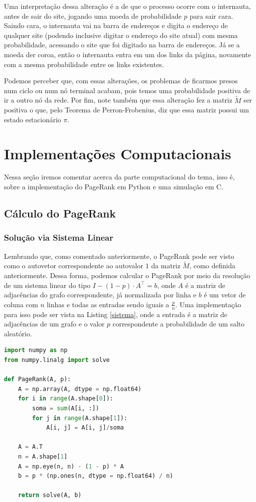 \documentclass{article}
\begin{document}
Uma interpretação dessa alteração é a de que o processo ocorre com o internauta, antes de sair do site, jogando uma moeda de probabilidade $p$ para sair cara. Saindo cara, o internauta vai na barra de endereços e digita o endereço de qualquer site (podendo inclusive digitar o endereço do site atual) com mesma probabilidade, acessando o site que foi digitado na barra de endereços. Já se a moeda der coroa, então o internauta entra em um dos links da página, novamente com a mesma probabilidade entre os links existentes.

Podemos perceber que, com essas alterações, os problemas de ficarmos presos num ciclo ou num nó terminal acabam, pois temos uma probabilidade positiva de ir a outro nó da rede. Por fim, note também que essa alteração fez a matriz $\tilde{M}$ ser positiva o que, pelo Teorema de Perron-Frobenius, diz que essa matriz possui um estado estacionário $\pi$.

\section*{Implementações Computacionais}

Nessa seção iremos comentar acerca da parte computacional do tema, isso é, sobre a implementação do PageRank em Python e uma simulação em C.

\subsection*{Cálculo do PageRank}

\subsubsection*{Solução via Sistema Linear}

Lembrando que, como comentado anteriormente, o PageRank pode ser visto como o autovetor correspondente ao autovalor $1$ da matriz $\tilde{M}$, como definida anteriormente. Dessa forma, podemos calcular o PageRank por meio da resolução de um sistema linear do tipo $I - (1 - p)\cdot A^\top = b$, onde $A$ é a matriz de adjacências do grafo correspondente, já normalizada por linha e $b$ é um vetor de coluna com $n$ linhas e todas as entradas sendo iguais a $\frac{p}{n}$. Uma implementação para isso pode ser vista na Listing \ref{sistema}, onde a entrada é a matriz de adjacências de um grafo e o valor $p$ correspondente a probabilidade de um salto aleatório.

\begin{lstlisting}[language = Python, caption = Algoritmos para calcular a integral dada de modo aproximado., label = sistema]
import numpy as np
from numpy.linalg import solve

def PageRank(A, p):
    A = np.array(A, dtype = np.float64)
    for i in range(A.shape[0]):
        soma = sum(A[i, :])
        for j in range(A.shape[1]):
            A[i, j] = A[i, j]/soma
    
    A = A.T
    n = A.shape[1]
    A = np.eye(n, n) - (1 - p) * A
    b = p * (np.ones(n, dtype = np.float64) / n)
    
    return solve(A, b)
\end{lstlisting}
\end{document}

